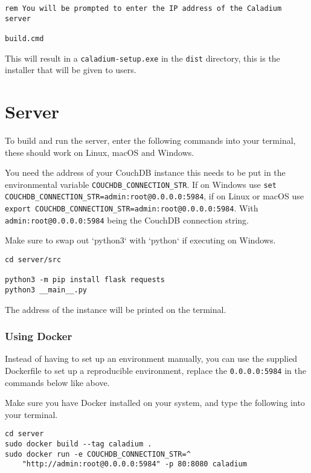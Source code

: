 \begin{appendices}
\begin{lstlisting}
rem You will be prompted to enter the IP address of the Caladium server

build.cmd
\end{lstlisting}

This will result in a \texttt{caladium-setup.exe} in the \texttt{dist} directory,
this is the installer that will be given to users.
\section{Server}
To build and run the server, enter the following commands into your terminal,
these should work on Linux, macOS and Windows.

You need the address of your CouchDB instance this needs
to be put in the environmental variable \texttt{COUCHDB\_CONNECTION\_STR}.
If on Windows use
\texttt{set COUCHDB\_CONNECTION\_STR=admin:root@0.0.0.0:5984},
if on Linux or macOS use
\texttt{export COUCHDB\_CONNECTION\_STR=admin:root@0.0.0.0:5984}.
With \texttt{admin:root@0.0.0.0:5984} being the CouchDB connection string.

Make sure to swap out `python3` with `python` if executing on Windows.
\begin{lstlisting}
cd server/src

python3 -m pip install flask requests
python3 __main__.py
\end{lstlisting}
The address of the instance will be printed on the terminal.

\subsubsection{Using Docker}
Instead of having to set up an environment manually,
you can use the supplied Dockerfile
to set up a reproducible environment,
replace the \texttt{0.0.0.0:5984} in the commands below like above.

Make sure you have Docker installed on your system,
and type the following into your terminal.

\begin{lstlisting}
cd server
sudo docker build --tag caladium .
sudo docker run -e COUCHDB_CONNECTION_STR=^
    "http://admin:root@0.0.0.0:5984" -p 80:8080 caladium
\end{lstlisting}

\end{appendices}
